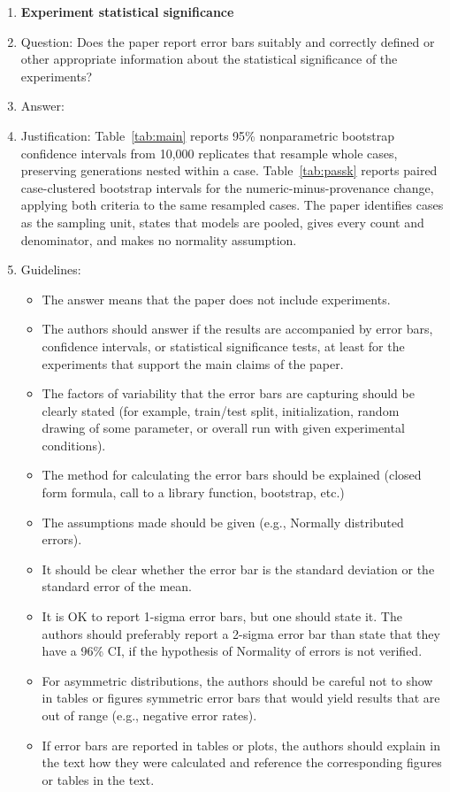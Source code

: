 \begin{enumerate}
\item {\bf Experiment statistical significance}
    \item[] Question: Does the paper report error bars suitably and correctly defined or other appropriate information about the statistical significance of the experiments?
    \item[] Answer: \answerYes{}
    \item[] Justification: Table~\ref{tab:main} reports 95\% nonparametric bootstrap confidence intervals from 10{,}000 replicates that resample whole cases, preserving generations nested within a case. Table~\ref{tab:passk} reports paired case-clustered bootstrap intervals for the numeric-minus-provenance change, applying both criteria to the same resampled cases. The paper identifies cases as the sampling unit, states that models are pooled, gives every count and denominator, and makes no normality assumption.
    \item[] Guidelines:
    \begin{itemize}
        \item The answer \answerNA{} means that the paper does not include experiments.
        \item The authors should answer \answerYes{} if the results are accompanied by error bars, confidence intervals, or statistical significance tests, at least for the experiments that support the main claims of the paper.
        \item The factors of variability that the error bars are capturing should be clearly stated (for example, train/test split, initialization, random drawing of some parameter, or overall run with given experimental conditions).
        \item The method for calculating the error bars should be explained (closed form formula, call to a library function, bootstrap, etc.)
        \item The assumptions made should be given (e.g., Normally distributed errors).
        \item It should be clear whether the error bar is the standard deviation or the standard error of the mean.
        \item It is OK to report 1-sigma error bars, but one should state it. The authors should preferably report a 2-sigma error bar than state that they have a 96\% CI, if the hypothesis of Normality of errors is not verified.
        \item For asymmetric distributions, the authors should be careful not to show in tables or figures symmetric error bars that would yield results that are out of range (e.g., negative error rates).
        \item If error bars are reported in tables or plots, the authors should explain in the text how they were calculated and reference the corresponding figures or tables in the text.
    \end{itemize}


\end{enumerate}
